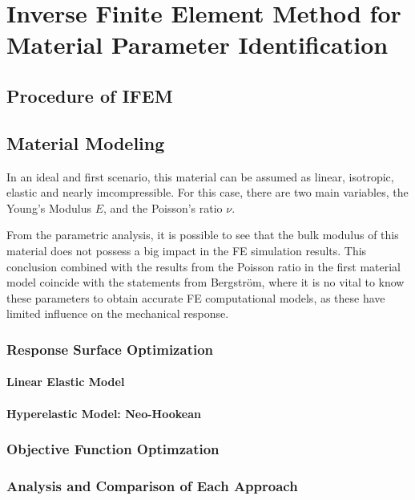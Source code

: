 
\chapter{Inverse Finite Element Method for Material Parameter Identification} %

\label{Chapter5} %

\section{Procedure of IFEM}
\section{Material Modeling}

In an ideal and first scenario, this material can be assumed as linear, isotropic, 
elastic and nearly imcompressible. For this case, there are two main variables, the Young's
Modulus \(E\), and the Poisson's ratio $\nu$.

From the parametric analysis, it is possible to see that the bulk 
modulus of this material does not possess a big impact in the FE 
simulation results. This conclusion combined with the results 
from the Poisson ratio in the first material model coincide with the 
statements from Bergström, where it is no vital to know these parameters 
to obtain accurate FE computational models, as these have limited
influence on the mechanical response. \cite{Bergström2015} %

\subsection{Response Surface Optimization}

\subsubsection*{Linear Elastic Model}

\subsubsection*{Hyperelastic Model: Neo-Hookean}



\subsection{Objective Function Optimzation}

\subsection{Analysis and Comparison of Each Approach}

